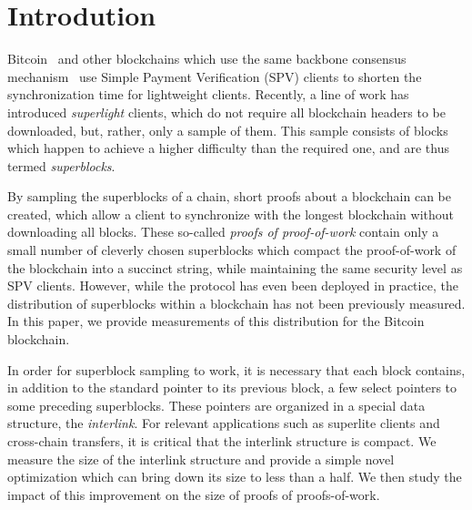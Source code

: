 \section{Introdution}

Bitcoin~\cite{bitcoin} and other blockchains which use the same backbone
consensus mechanism~\cite{EC:GarKiaLeo15} use Simple Payment Verification (SPV)
clients to shorten the synchronization time for lightweight clients. Recently, a
line of work has introduced \emph{superlight} clients, which do not require all
blockchain headers to be downloaded, but, rather, only a sample of them. This
sample consists of blocks which happen to achieve a higher difficulty than the
required one, and are thus termed \emph{superblocks}.

By sampling the superblocks of a chain, short proofs about a blockchain can be
created, which allow a client to synchronize with the longest blockchain without
downloading all blocks. These so-called \emph{proofs of proof-of-work} contain
only a small number of cleverly chosen superblocks which compact the
proof-of-work of the blockchain into a succinct string, while maintaining the
same security level as SPV clients. However, while the protocol has even been deployed in
practice, the distribution of superblocks within a blockchain has not been
previously measured. In this paper, we provide measurements of this distribution for the
Bitcoin blockchain.

In order for superblock sampling to work, it is necessary that each block
contains, in addition to the standard pointer to its previous block, a few
select pointers to some preceding superblocks. These pointers are organized in a
special data structure, the \emph{interlink}. For relevant applications such as
superlite clients and cross-chain transfers, it is critical that the interlink
structure is compact. We measure the size of the interlink structure and provide
a simple novel optimization which can bring down its size to less than a
half. We then study the impact of this improvement on the size of proofs of
proofs-of-work.

